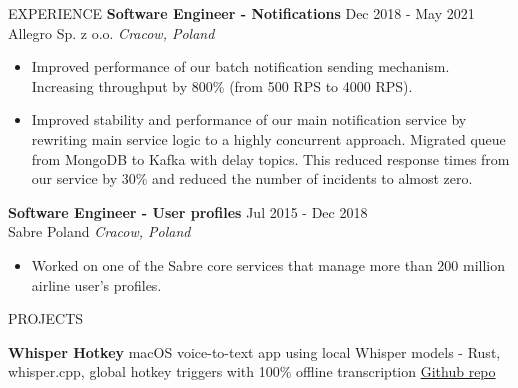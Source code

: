 \documentclass{resume} %
\begin{document}
\begin{rSection}{EXPERIENCE}
\textbf{Software Engineer - Notifications} \hfill Dec 2018 - May 2021\\
Allegro Sp. z o.o. \hfill \textit{Cracow, Poland}
 \begin{itemize}
    \itemsep -2pt {} 
     \item Improved performance of our batch notification sending mechanism. Increasing throughput by 800\% (from 500 RPS to 4000 RPS). 
     \item Improved stability and performance of our main notification service by rewriting main service logic to a highly concurrent approach. Migrated queue from MongoDB to Kafka with delay topics. This reduced response times from our service by 30\% and reduced the number of incidents to almost zero.
 \end{itemize} 
 
\textbf{Software Engineer - User profiles} \hfill Jul 2015 - Dec 2018\\
Sabre Poland \hfill \textit{Cracow, Poland}
 \begin{itemize}
    \itemsep -2pt {} 
     \item Worked on one of the Sabre core services that manage more than 200 million airline user's profiles. 
 \end{itemize}

\end{rSection} 


\begin{rSection}{PROJECTS}
\vspace{-1em}
\item \textbf{Whisper Hotkey} {macOS voice-to-text app using local Whisper models - Rust, whisper.cpp, global hotkey triggers with 100\% offline transcription \href{https://github.com/Automaat/whisper-hotkey}{Github repo}}
\end{rSection} 
\end{document}
